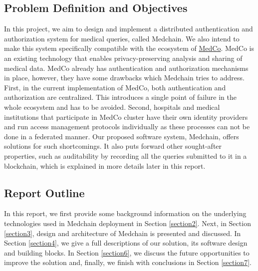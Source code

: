 \subsection{Problem Definition and Objectives}

In this project, we aim to design and implement a distributed authentication and authorization system for medical queries, called Medchain. We also intend to make this system specifically compatible with the ecosystem of \href{https://medco.epfl.ch/}{MedCo}. MedCo is an existing technology that enables privacy-preserving analysis and sharing of medical data. MedCo already has authentication and authorization mechanisms in place, however, they have some drawbacks which Medchain tries to address. First, in the current implementation of MedCo, both authentication and authorization are centralized. This introduces a single point of failure in the whole ecosystem and has to be avoided. Second, hospitals and medical institutions that participate in MedCo cluster have their own identity providers and run access management protocols individually as these processes can not be done in a federated manner. Our proposed software system, Medchain, offers solutions for such shortcomings. It also puts forward other sought-after properties, such as auditability by recording all the queries submitted to it in a blockchain, which is explained in more details later in this report. 


\subsection{Report Outline}
In this report, we first provide some background information on the underlying technologies used in Medchain deployment in Section \ref{section2}. Next, in Section \ref{section3}, design and architecture of Medchain is presented and discussed. In Section \ref{section4}, we give a full descriptions of our solution, its software design and building blocks. In Section \ref{section6}, we discuss the future opportunities to improve the solution and, finally, we finish with conclusions in Section \ref{section7}.